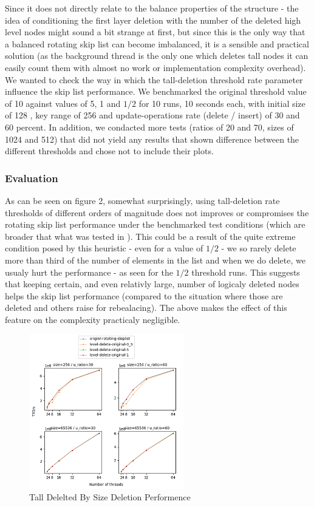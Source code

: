 \documentclass{article}
\begin{document}
Since it does not directly relate to the balance properties of the structure - the idea of conditioning the first layer deletion with the number of the deleted high level nodes might sound a bit strange at first, but since this is the only way that a balanced rotating skip list can become imbalanced, it is a sensible and practical solution (as the background thread is the only one which deletes tall nodes it can easily count them with almost no work or implementation complexity overhead). We wanted to check the way in which the tall-deletion threshold rate parameter influence the skip list performance. We benchmarked the original threshold value of 10 against values of 5, 1 and $1/2$ for 10 runs, 10 seconds each, with initial size of 128 , key range of 256 and update-operations rate (delete / insert) of 30 and 60 percent. In addition, we condacted more tests (ratios of 20 and 70, sizes of 1024 and 512) that did not yield any results that shown difference between the different thresholds and chose not to include their plots.

\subsubsection{Evaluation}
\label{sssec:tds-evl}

As can be seen on figure 2, somewhat surprisingly, using tall-deletion rate thresholds of different orders of magnitude does not improves or compromises the rotating skip list performance under the benchmarked test conditions (which are broader that what was tested in \cite{C1}). This could be a result of the quite extreme condition posed by this heuristic - even for a value of $1/2$ - we so rarely delete more than third of the number of elements in the list and when we do delete, we usualy hurt the performance - as seen for the $1/2$ threshold runs. This suggests that keeping certain, and even relativly large, number of logicaly deleted nodes helps the skip list performance (compared to the situation where those are deleted and others raise for rebealacing). The above makes the effect of this feature on the complexity practicaly negligible.

\begin{figure}
	\caption{Tall Delelted By Size Deletion Performence}
	\centering
	\includegraphics[width=0.6\textwidth]{level-delete-original_plot}
\end{figure}
\end{document}
